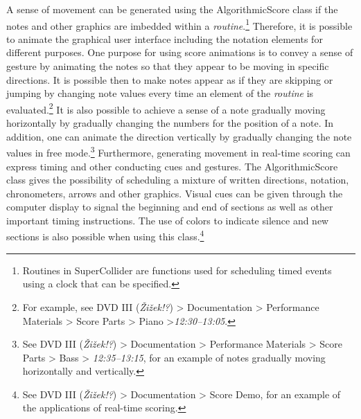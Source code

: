 A sense of movement can be generated using the AlgorithmicScore class if the notes and other graphics are imbedded within a \emph{routine}.\footnote{Routines in SuperCollider are functions used for scheduling timed events using a clock that can be specified.} Therefore, it is possible to animate the graphical user interface including the notation elements for different purposes. One purpose for using score animations is to convey a sense of gesture by animating the notes so that they appear to be moving in specific directions. It is possible then to make notes appear as if they are skipping or jumping by changing note values every time an element of the \emph{routine} is evaluated.\footnote{For example, see DVD III (\emph{\v{Z}i\v{z}ek!?}) \tiny \textgreater \footnotesize \hspace{0pt} Documentation \tiny \textgreater \footnotesize \hspace{0pt} Performance Materials \tiny \textgreater \footnotesize \hspace{0pt} Score Parts \tiny \textgreater \footnotesize \hspace{0pt} Piano \tiny \textgreater \footnotesize \hspace{0pt}\mbox{\emph{12:30--13:05}}.} It is also possible to achieve a sense of a note gradually moving horizontally by gradually changing the numbers for the position of a note. In addition, one can animate the direction vertically by gradually changing the note values in free mode.\footnote{See DVD III (\emph{\v{Z}i\v{z}ek!?}) \tiny \textgreater \footnotesize \hspace{0pt} Documentation \tiny \textgreater \footnotesize \hspace{0pt} Performance Materials \tiny \textgreater \footnotesize \hspace{0pt} Score Parts \tiny \textgreater \footnotesize \hspace{0pt} Bass \tiny \textgreater \footnotesize \hspace{0pt} \mbox{\emph{12:35--13:15}}, for an example of notes gradually moving horizontally and vertically.} Furthermore, generating movement in real-time scoring can express timing and other conducting cues and gestures. The AlgorithmicScore class gives the possibility of scheduling a mixture of written directions, notation, chronometers, arrows and other graphics.  Visual cues can be given through the computer display to signal the beginning and end of sections as well as other important timing instructions. The use of colors to indicate silence and new sections is also possible when using this class.\footnote{See DVD III (\emph{\v{Z}i\v{z}ek!?}) \tiny \textgreater \footnotesize \hspace{0pt} Documentation \tiny \textgreater \footnotesize \hspace{0pt} Score Demo, for an example of the applications of real-time scoring.} 

